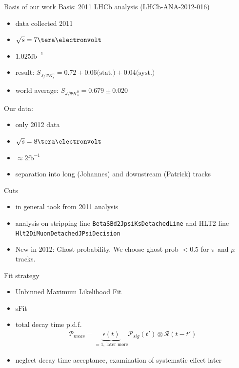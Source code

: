 \documentclass{beamer}
\newcommand{\SJPsi}{S_{J/\Psi K_s^0}}
\begin{document}
	\begin{frame}{Basis of our work}
	Basis: 2011 LHCb analysis (LHCb-ANA-2012-016)
	\begin{itemize}
	    \item data collected 2011
	    \item $\sqrt{s} = 7\tera\electronvolt$
	    \item $1.025 \mathrm{fb}^{-1}$
	    \item result: $\SJPsi = 0.72 \pm 0.06 \text{(stat.)} \pm 0.04 \text{(syst.)}$
	    \item world average: $\SJPsi = 0.679 \pm 0.020$
	\end{itemize}
	
	Our data:
	\begin{itemize}
	    \item only 2012 data
	    \item $\sqrt{s} = 8\tera\electronvolt$
	    \item $\approx 2 \mathrm{fb}^{-1}$
   	    \item separation into long (Johannes) and downstream (Patrick) tracks
	\end{itemize}
	\end{frame}

	
	\begin{frame}{Cuts}
    \begin{itemize}
    \item in general took from 2011 analysis
    \item analysis on stripping line \texttt{BetaSBd2JpsiKsDetachedLine} and HLT2 line \texttt{Hlt2DiMuonDetachedJPsiDecision}
	\item New in 2012: Ghost probability. We choose ghost prob $<0.5$ for $\pi$ and $\mu$ tracks.
	\end{itemize}
	\end{frame}
	
	\begin{frame}{Fit strategy}
	\begin{itemize}
	\item Unbinned Maximum Likelihood Fit
	\item sFit
	\item total decay time p.d.f.
	\begin{align}
	\mathcal{P}_{meas} = \underbrace{\epsilon(t)}_{= 1,\ \text{later more}}\mathcal{P}_{sig}(t') \otimes \mathcal{R}(t-t')
	\end{align}
	\item neglect decay time acceptance, examination of systematic effect later
	\end{itemize}
	\end{frame}
	
\end{document}
